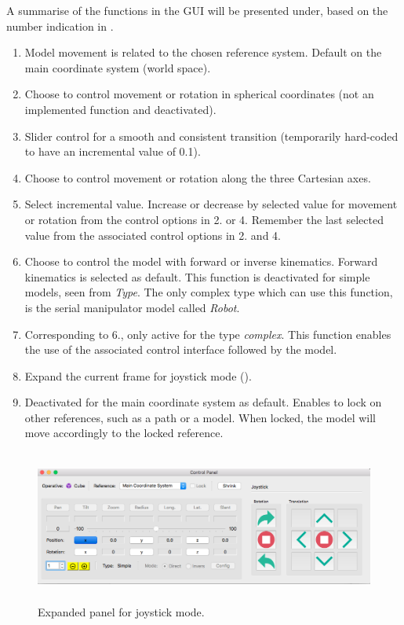 A summarise of the functions in the GUI will be presented under, based on the number indication in .
\begin{enumerate}
\item Model movement is related to the chosen reference system. Default on the main coordinate system (world space).

\item Choose to control movement or rotation in spherical coordinates (not an implemented function and deactivated).

\item Slider control for a smooth and consistent transition (temporarily hard-coded to have an incremental value of 0.1).

\item Choose to control movement or rotation along the three Cartesian axes.

\item Select incremental value. Increase or decrease by selected value for movement or rotation from the control options in 2. or 4. Remember the last selected value from the associated control options in 2. and 4.

\item Choose to control the model with forward or inverse kinematics. Forward kinematics is selected as default. This function is deactivated for simple models, seen from \textit{Type}. The only complex type which can use this function, is the serial manipulator model called \textit{Robot}.

\item Corresponding to 6., only active for the type \textit{complex}. This function enables the use of the associated control interface followed by the model.

\item Expand the current frame for joystick mode ().

\item Deactivated for the main coordinate system as default. Enables to lock on other references, such as a path or a model. When locked, the model will move accordingly to the locked reference.
\end{enumerate}

\begin{figure}[ht]
    \centering
    \includegraphics[height=5cm]{images/Joystick.png}
    \caption[Expanded panel for joystick mode]{Expanded panel for joystick mode.}
    \label{fig:joystick}
\end{figure}

